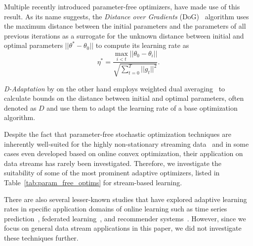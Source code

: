 \documentclass[letterpaper]{article} %
\begin{document}
Multiple recently introduced parameter-free optimizers, have made use of this result.
As its name suggests, the \textit{Distance over Gradients} (DoG)~\cite{ivgiDoGSGDBest2023} algorithm uses the maximum distance between the initial parameters and the parameters of all previous iterations as a surrogate for the unknown distance between initial and optimal parameters $||\theta^* - \theta_0||$ to compute its learning rate as
\begin{equation}
	\eta^* = \frac{\max_{i<t}||\theta_0 - \theta_i||}{\sqrt{\sum_{t=0}^{T} ||g_t||^2}}.
\end{equation}

\textit{D-Adaptation} by \citet{defazioLearningRateFreeLearningDAdaptation2023a} on the other hand employs weighted dual averaging~\cite{duchiDualAveragingDistributed2012} to calculate bounds on the distance between initial and optimal parameters, often denoted as $D$ and use them to adapt the learning rate of a base optimization algorithm.

Despite the fact that parameter-free stochastic optimization techniques are inherently well-suited for the highly non-stationary streaming data~\cite{schaulNoMorePesky2013} and in some cases even developed based on online convex optimization, their application on data streams has rarely been investigated.
Therefore, we investigate the suitability of some of the most prominent adaptive optimizers, listed in Table~\ref{tab:param_free_optims} for stream-based learning.

There are also several lesser-known studies that have explored adaptive learning rates in specific application domains of online learning such as time series prediction~\cite{miyaguchiCograConceptDriftAwareStochastic2019, fekriDeepLearningLoad2021, zhangPOLAOnlineTime2021a}, federated learning~\cite{canonacoAdaptiveFederatedLearning2021}, and recommender systems~\cite{ferreirajoseADADRIFTAdaptiveLearning2020}.
However, since we focus on general data stream applications in this paper, we did not investigate these techniques further. 
\end{document}
